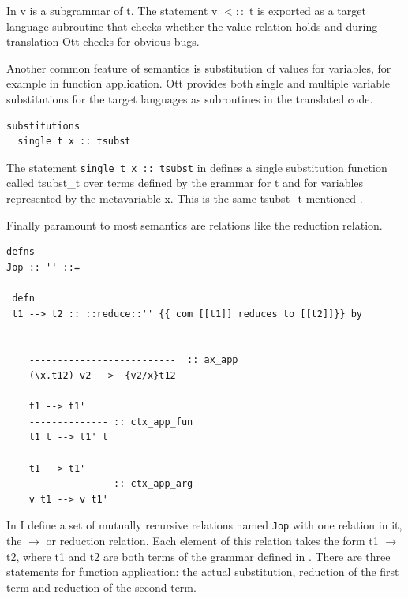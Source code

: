 \documentclass[12pt,twoside,notitlepage]{report}
\theoremstyle{plain}%
\theoremstyle{definition}
\theoremstyle{remark}
\begin{document}
In  v is a subgrammar of t. The statement v $<::$ t is exported as a target language subroutine that checks whether the value relation holds and during translation Ott checks for obvious bugs.

Another common feature of semantics is substitution of values for variables, for example in function application. Ott provides both single and multiple variable substitutions for the target languages as subroutines in the translated code.


\vspace{3mm}

\begin{minipage}{\linewidth}

\begin{lstlisting}[language={Ott}, caption={Ott substitution example}, label={lst:ottsubstex}]
substitutions
  single t x :: tsubst 
\end{lstlisting}

\end{minipage}


The statement \lstinline[language={Ott}]|single t x :: tsubst| in  defines a single substitution function called tsubst\_t over terms defined by the grammar for t and for variables represented by the metavariable x. This is the same tsubst\_t mentioned .



Finally paramount to most semantics are relations like the reduction relation.\vspace{3mm}


\begin{minipage}{\linewidth}
\begin{lstlisting}[language={Ott}, caption={Ott reduction relation example}, label={lst:ottredex}]
defns
Jop :: '' ::=

 defn
 t1 --> t2 :: ::reduce::'' {{ com [[t1]] reduces to [[t2]]}} by


    --------------------------  :: ax_app
    (\x.t12) v2 -->  {v2/x}t12

    t1 --> t1'
    -------------- :: ctx_app_fun
    t1 t --> t1' t

    t1 --> t1'
    -------------- :: ctx_app_arg
    v t1 --> v t1'
\end{lstlisting}
\end{minipage}

In  I define a set of mutually recursive relations named \verb|Jop| with one relation in it, the $\longrightarrow$ or reduction relation. Each element of this relation takes the form t1 $\longrightarrow$ t2, where t1 and t2 are both terms of the grammar defined in . There are three statements for function application: the actual substitution, reduction of the first term and reduction of the second term. 
\end{document}
